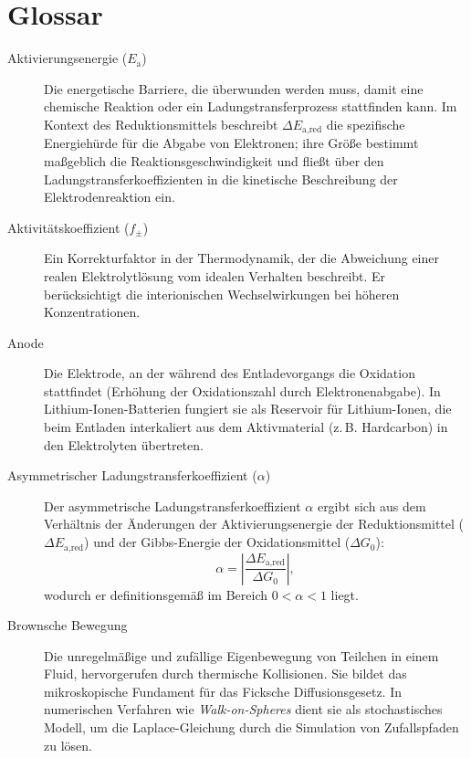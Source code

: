 \chapter{Glossar}\label{sec:glosar}

\begin{description}
    \item[Aktivierungsenergie ($E_{\text{a}}$)] Die energetische Barriere, die überwunden werden muss, damit eine chemische Reaktion oder ein Ladungstransferprozess stattfinden kann. Im Kontext des Reduktionsmittels beschreibt $\Delta E_{\text{a,red}}$ die spezifische Energiehürde für die Abgabe von Elektronen; ihre Größe bestimmt maßgeblich die Reaktionsgeschwindigkeit und fließt über den Ladungstransferkoeffizienten in die kinetische Beschreibung der Elektrodenreaktion ein.

    \item[Aktivitätskoeffizient ($f_{\pm}$)] Ein Korrekturfaktor in der Thermodynamik, der die Abweichung einer realen Elektrolytlösung vom idealen Verhalten beschreibt. Er berücksichtigt die interionischen Wechselwirkungen bei höheren Konzentrationen.
    
    \item[Anode] Die Elektrode, an der während des Entladevorgangs die Oxidation stattfindet (Erhöhung der Oxidationszahl durch Elektronenabgabe). In Lithium-Ionen-Batterien fungiert sie als Reservoir für Lithium-Ionen, die beim Entladen interkaliert aus dem Aktivmaterial (z.\,B. Hardcarbon) in den Elektrolyten übertreten.
    
    \item[Asymmetrischer Ladungstransferkoeffizient ($\alpha$)] Der asymmetrische Ladungstransferkoeffizient $\alpha$ ergibt sich aus dem Verhältnis der Änderungen der Aktivierungsenergie der Reduktionsmittel ($\Delta E_{\text{a,red}}$) und der Gibbs-Energie der Oxidationsmittel ($\Delta G_0$): \begin{equation} \alpha = \left|\frac{\Delta E_{\text{a,red}}}{\Delta G_0}\right|, \end{equation} wodurch er definitionsgemäß im Bereich $0 < \alpha < 1$ liegt.

    \item[Brownsche Bewegung] Die unregelmäßige und zufällige Eigenbewegung von Teilchen in einem Fluid, hervorgerufen durch thermische Kollisionen. Sie bildet das mikroskopische Fundament für das Ficksche Diffusionsgesetz. In numerischen Verfahren wie \textit{Walk-on-Spheres} dient sie als stochastisches Modell, um die Laplace-Gleichung durch die Simulation von Zufallspfaden zu lösen.
    

\end{description}

